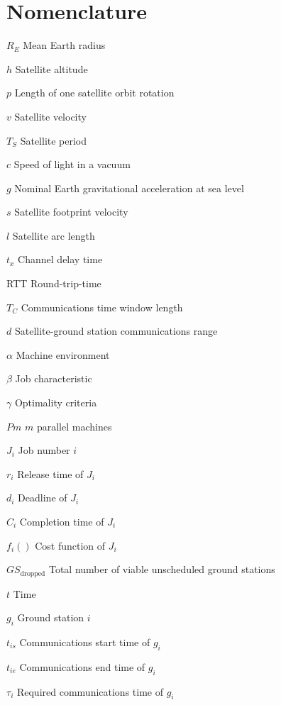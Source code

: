 \chapter{Nomenclature}

\newlength{\gnat}

\begin{Nomencl}[\gnat]

		\item[$R_E$]		Mean Earth radius
		\item[$h$]			Satellite altitude
		\item[$p$]			Length of one satellite orbit rotation
		\item[$v$]			Satellite velocity
		\item[$T_S$]		Satellite period
		\item[$c$]			Speed of light in a vacuum
		\item[$g$]			Nominal Earth gravitational acceleration at sea level
		\item[$s$]			Satellite footprint velocity
		\item[$l$]			Satellite arc length
		\item[$t_x$]		Channel delay time
		\item[RTT]			Round-trip-time
		\item[$T_C$]		Communications time window length
		\item[$d$]			Satellite-ground station communications range
      
		\item[$\alpha$]						Machine environment
		\item[$\beta$]						Job characteristic
		\item[$\gamma$]					Optimality criteria
		\item[$Pm$]							$m$ parallel machines
		\item[$J_i$]							Job number $i$
		\item[$r_i$]							Release time of $J_i$
		\item[$d_i$]							Deadline of $J_i$
		\item[$C_i$]							Completion time of $J_i$
		\item[$f_i()$]							Cost function of $J_i$
		\item[$GS_\textrm{dropped}$]	Total number of viable unscheduled ground stations
		
		\item[$t$]			Time
		\item[$g_i$]		Ground station $i$
		\item[$t_{is}$]	Communications start time of $g_i$
		\item[$t_{ie}$]	Communications end time of $g_i$
		\item[$\tau_i$]	Required communications time of $g_i$
		

\end{Nomencl}
